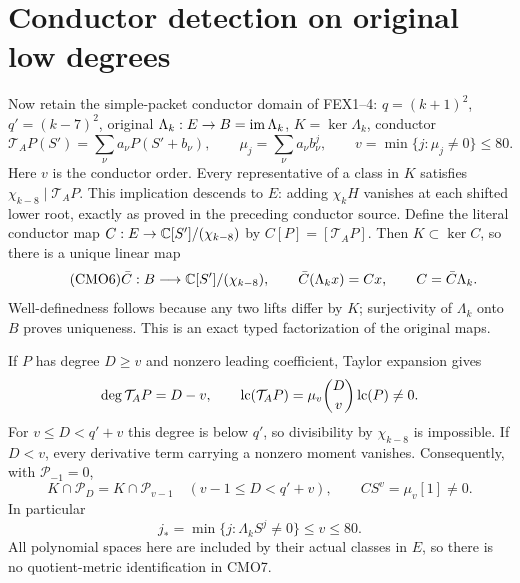 \documentclass[11pt,a4paper]{article}
\begin{document}
\section{Conductor detection on original low degrees}
Now retain the simple-packet conductor domain of FEX1--4:
$q=(k+1)^2$, $q'=(k-7)^2$, original $\Lambda_k:E\to B=\operatorname{im}\Lambda_k$,
$K=\ker\Lambda_k$, conductor
\[
 \mathcal T_AP(S')=\sum_{\nu}a_\nu P(S'+b_\nu),\qquad
 \mu_j=\sum_\nu a_\nu b_\nu^j,\qquad
 v=\min\{j:\mu_j\ne0\}\le80 .
\]
Here $v$ is the conductor order. Every representative of a class
in $K$ satisfies $\chi_{k-8}\mid\mathcal T_AP$.
This implication descends to $E$: adding $\chi_kH$ vanishes
at each shifted lower root, exactly as proved in the preceding
conductor source.
Define the literal conductor map
$C:E\to\mathbb C[S']/(\chi_{k-8})$ by $C[P]=[\mathcal T_AP]$.
Then $K\subset\ker C$, so there is a unique linear map
\begin{equation}\tag{CMO6}
 \bar C:B\longrightarrow\mathbb C[S']/(\chi_{k-8}),\qquad
 \bar C(\Lambda_kx)=Cx,\qquad C=\bar C\Lambda_k .
\end{equation}
Well-definedness follows because any two lifts differ by $K$;
surjectivity of $\Lambda_k$ onto $B$ proves uniqueness.
This is an exact typed factorization of the original maps.

If $P$ has degree $D\ge v$ and nonzero leading coefficient,
Taylor expansion gives
\[
 \deg\mathcal T_AP=D-v,\qquad
 \operatorname{lc}(\mathcal T_AP)=\mu_v\binom Dv\operatorname{lc}(P)\ne0 .
\]
For $v\le D<q'+v$ this degree is below $q'$, so
divisibility by $\chi_{k-8}$ is impossible.
If $D<v$, every derivative term carrying a nonzero moment
vanishes. Consequently, with $\mathcal P_{-1}=0$,
\begin{equation}\tag{CMO7}
 K\cap\mathcal P_D=K\cap\mathcal P_{v-1}
 \quad(v-1\le D<q'+v),\qquad
 CS^v=\mu_v[1]\ne0 .
\end{equation}
In particular
\begin{equation}\tag{CMO8}
 j_*=\min\{j:\Lambda_k S^j\ne0\}\le v\le80 .
\end{equation}
All polynomial spaces here are included by their actual classes
in $E$, so there is no quotient-metric identification in CMO7.
\end{document}
